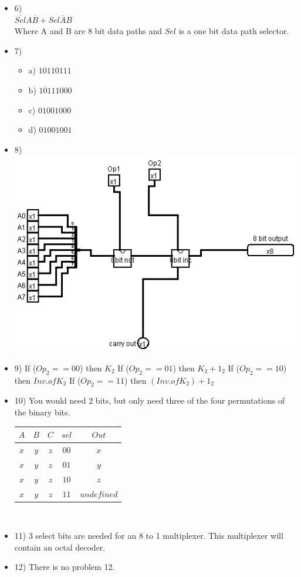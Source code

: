 \documentclass{article}
\begin{document}
\begin{itemize}
  \item
		6)\\
		$\overline{Sel}A\overline{B}+Sel\overline{A}B$
		\\Where A and B are 8 bit data paths and $Sel$ is a one bit data path selector.
	\item
		7)\\
	\begin{itemize}
		\item
			a)
			$10110111$
		\item
			b)
			$10111000$
		\item
			c)
			$01001000$
		\item
			d)
			$01001001$
	\end{itemize}
	\item
		8)\\
	  \includegraphics[scale=0.5]{assignment38bittinyalu.png}
	\item
		9)
		If ($Op_{2} == 00$) then $K_{2}$
		If ($Op_{2} == 01$) then $K_{2}+1_{2}$
		If ($Op_{2} == 10$) then $Inv. of K_{2}$
		If ($Op_{2} == 11$) then $(Inv. of K_{2})+1_{2}$
	\item
		10)
		You would need 2 bits, but only need three of the four permutations of the binary bits.\\
    
    \begin{tabular}{cccc|c}
    $A$ & $B$ & $C$ & $sel$ & $Out$\\ \hline
    $x$ & $y$ & $z$ & $00$ & $x$\\
    $x$ & $y$ & $z$ & $01$ & $y$\\
    $x$ & $y$ & $z$ & $10$ & $z$\\
    $x$ & $y$ & $z$ & $11$ & $undefined$\\
    \end{tabular}\\
		
	\item
		11) 3 select bits are needed for an 8 to 1 multiplexer. This multiplexer will contain an octal decoder.
	\item
		12) There is no problem 12.
\end{itemize}
\end{document}
